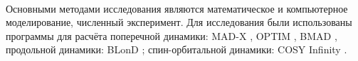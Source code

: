 ~\\
\par {\methods} Основными методами исследования являются математическое и компьютерное моделирование, численный эксперимент. Для исследования были использованы программы для расчёта поперечной динамики: MAD-X \cite{madx}, OPTIM \cite{optim}, BMAD \cite{bmad}, продольной динамики: BLonD \cite{blond}; спин-орбитальной динамики: COSY Infinity \cite{cosy}.
~\\

